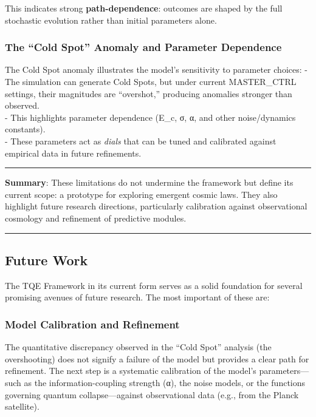 This indicates strong \textbf{path-dependence}: outcomes are shaped by
the full stochastic evolution rather than initial parameters alone.

\subsubsection{The ``Cold Spot'' Anomaly and Parameter
Dependence}\label{the-cold-spot-anomaly-and-parameter-dependence}

The Cold Spot anomaly illustrates the model's sensitivity to parameter
choices: - The simulation can generate Cold Spots, but under current
MASTER\_CTRL settings, their magnitudes are ``overshot,'' producing
anomalies stronger than observed.\\
- This highlights parameter dependence (E\_c, σ, α, and other
noise/dynamics constants).\\
- These parameters act as \emph{dials} that can be tuned and calibrated
against empirical data in future refinements.

\begin{center}\rule{0.5\linewidth}{0.5pt}\end{center}

\textbf{Summary}: These limitations do not undermine the framework but
define its current scope: a prototype for exploring emergent cosmic
laws. They also highlight future research directions, particularly
calibration against observational cosmology and refinement of predictive
modules.

\begin{center}\rule{0.5\linewidth}{0.5pt}\end{center}

\subsection{Future Work}\label{future-work}

The TQE Framework in its current form serves as a solid foundation for
several promising avenues of future research. The most important of
these are:

\subsubsection{Model Calibration and
Refinement}\label{model-calibration-and-refinement}

The quantitative discrepancy observed in the ``Cold Spot'' analysis (the
overshooting) does not signify a failure of the model but provides a
clear path for refinement. The next step is a systematic calibration of
the model's parameters---such as the information-coupling strength (α),
the noise models, or the functions governing quantum collapse---against
observational data (e.g., from the Planck satellite).

